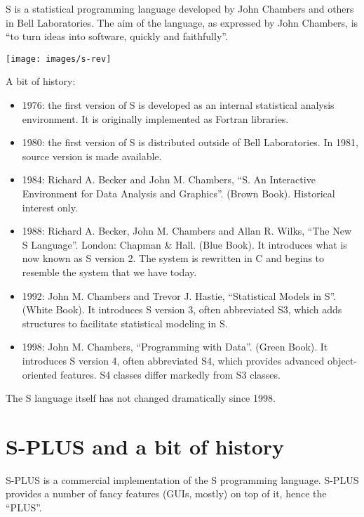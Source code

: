 \documentclass[]{book}
\providecommand{\tightlist}{%
  \setlength{\itemsep}{0pt}\setlength{\parskip}{0pt}}
\def\tightlist{}
\begin{document}
S is a statistical programming language developed by John Chambers and
others in Bell Laboratories. The aim of the language, as expressed by
John Chambers, is ``to turn ideas into software, quickly and
faithfully''.

\begin{center}\texttt{[image: images/s-rev]} \end{center}

A bit of history:

\begin{itemize}
\tightlist
\item
  1976: the first version of S is developed as an internal statistical
  analysis environment. It is originally implemented as Fortran
  libraries.
\item
  1980: the first version of S is distributed outside of Bell
  Laboratories. In 1981, source version is made available.
\item
  1984: Richard A. Becker and John M. Chambers, ``S. An Interactive
  Environment for Data Analysis and Graphics''. (Brown Book). Historical
  interest only.
\item
  1988: Richard A. Becker, John M. Chambers and Allan R. Wilks, ``The
  New S Language''. London: Chapman \& Hall. (Blue Book). It introduces
  what is now known as S version 2. The system is rewritten in C and
  begins to resemble the system that we have today.
\item
  1992: John M. Chambers and Trevor J. Hastie, ``Statistical Models in
  S''. (White Book). It introduces S version 3, often abbreviated S3,
  which adds structures to facilitate statistical modeling in S.
\item
  1998: John M. Chambers, ``Programming with Data''. (Green Book). It
  introduces S version 4, often abbreviated S4, which provides advanced
  object-oriented features. S4 classes differ markedly from S3 classes.
\end{itemize}

The S language itself has not changed dramatically since 1998.

\section{S-PLUS and a bit of history}\label{s-plus-and-a-bit-of-history}

S-PLUS is a commercial implementation of the S programming language.
S-PLUS provides a number of fancy features (GUIs, mostly) on top of it,
hence the ``PLUS''.
\end{document}
